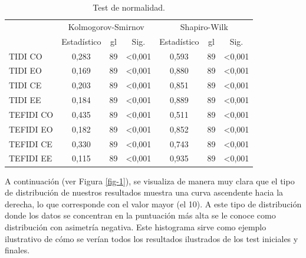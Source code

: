 \documentclass[spanish]{textolivre}
\begin{document}
\begin{table}[ht]
\centering
\begin{threeparttable}
\caption{Test de normalidad.}\label{tab-2}
\begin{tabular}{lcccccc}
\toprule
 & \multicolumn{3}{c}{Kolmogorov-Smirnov} & \multicolumn{3}{c}{Shapiro-Wilk} \\
\cmidrule(lr){2-4} \cmidrule(lr){5-7}
 & Estadístico & gl & Sig. & Estadístico & gl & Sig. \\
\midrule
TIDI CO     & 0,283 & 89 & <0,001 & 0,593 & 89 & <0,001 \\
TIDI EO     & 0,169 & 89 & <0,001 & 0,880 & 89 & <0,001 \\
TIDI CE     & 0,203 & 89 & <0,001 & 0,851 & 89 & <0,001 \\
TIDI EE     & 0,184 & 89 & <0,001 & 0,889 & 89 & <0,001 \\
TEFIDI CO   & 0,435 & 89 & <0,001 & 0,511 & 89 & <0,001 \\
TEFIDI EO   & 0,182 & 89 & <0,001 & 0,852 & 89 & <0,001 \\
TEFIDI CE   & 0,330 & 89 & <0,001 & 0,743 & 89 & <0,001 \\
TEFIDI EE   & 0,115 & 89 & <0,001 & 0,935 & 89 & <0,001 \\
\bottomrule
\end{tabular}
\end{threeparttable}
\end{table}

A continuación (ver Figura \ref{fig-1}), se visualiza de manera muy clara que el tipo de distribución de nuestros resultados muestra una curva ascendente hacia la derecha, lo que corresponde con el valor mayor (el 10). A este tipo de distribución donde los datos se concentran en la puntuación más alta se le conoce como distribución con asimetría negativa. Este histograma sirve como ejemplo ilustrativo de cómo se verían todos los resultados ilustrados de los test iniciales y finales.
\end{document}
